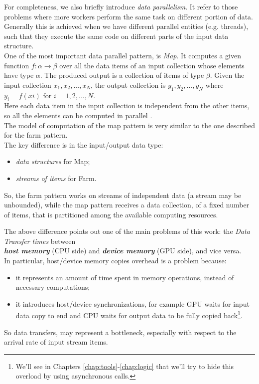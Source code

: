 	For completeness, we also briefly introduce \textit{data parallelism}. It refer to those problems where more workers perform the same task on different portion of data.\\
	Generally this is achieved when we have different parallel entities (e.g. threads), such that they execute the same code on different parts of the input data structure.\\
	
	One of the most important data parallel pattern, is \textit{Map}. It computes a given function \(f:\alpha\rightarrow\beta\) over all the  data items of an input collection whose elements have type \(\alpha\). The  produced output is a collection of items of type \(\beta\).  Given the input collection \(x_{1},x_{2},...,x_{N}\), the output collection is \(y_{1},y_{2},...,y_{N}\) where \(y_{i}=f(xi)\) for \(i=1,2,...,N\).\\
	Here each data item in the input collection is  independent from the other items, so all the  elements can be computed in parallel \cite{parpattbench}.\\
	
	The model of computation of the map pattern is very similar to the one described for the farm pattern.\\
	The key difference is in the input/output data type:
	\begin{itemize}			
		\item \textit{data structures} for Map;
		\item \textit{streams of items} for Farm.
	\end{itemize}
	So, the farm pattern works on streams of independent data (a stream may be unbounded), while the map pattern receives a data collection, of a fixed number of items, that is partitioned among the available computing resources.

	The above difference points out one of the main problems of this work: the \textit{Data Transfer times} between\\ \textit{\textbf{host memory}} (CPU side) and \textit{\textbf{device memory}} (GPU side), and vice versa.\\ 
	In particular, host/device memory copies  overhead is a problem because:
	\begin{itemize}
		\item it represents an amount of time spent in memory operations, instead of necessary computations;
		\item it introduces host/device synchronizations, for example GPU waits for input data copy to end and CPU waits for output data to be fully copied back\footnote{We'll see in Chapters \ref{chap:tools}-\ref{chap:logic} that we'll try to hide this overload by using asynchronous calls.}.
	\end{itemize}
	So data transfers, may represent a bottleneck, especially with respect to the arrival rate of input stream items.
	
